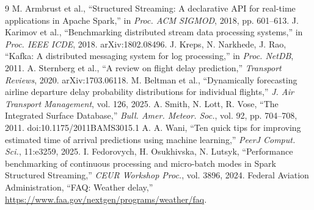 \documentclass[10pt]{article}
\begin{document}
\begingroup\footnotesize
\begin{thebibliography}{9}
\setlength{\itemsep}{0pt}\setlength{\parsep}{0pt}
 M. Armbrust et al., ``Structured Streaming: A declarative API for real-time applications in Apache Spark,'' in \emph{Proc. ACM SIGMOD}, 2018, pp. 601--613.
 J. Karimov et al., ``Benchmarking distributed stream data processing systems,'' in \emph{Proc. IEEE ICDE}, 2018. arXiv:1802.08496.
 J. Kreps, N. Narkhede, J. Rao, ``Kafka: A distributed messaging system for log processing,'' in \emph{Proc. NetDB}, 2011.
 A. Sternberg et al., ``A review on flight delay prediction,'' \emph{Transport Reviews}, 2020. arXiv:1703.06118.
 M. Beltman et al., ``Dynamically forecasting airline departure delay probability distributions for individual flights,'' \emph{J. Air Transport Management}, vol. 126, 2025.
 A. Smith, N. Lott, R. Vose, ``The Integrated Surface Database,'' \emph{Bull. Amer. Meteor. Soc.}, vol. 92, pp. 704--708, 2011. doi:10.1175/2011BAMS3015.1
 A. A. Wani, ``Ten quick tips for improving estimated time of arrival predictions using machine learning,'' \emph{PeerJ Comput. Sci.}, 11:e3259, 2025.
 I. Fedorovych, H. Osukhivska, N. Lutsyk, ``Performance benchmarking of continuous processing and micro-batch modes in Spark Structured Streaming,'' \emph{CEUR Workshop Proc.}, vol. 3896, 2024.
 Federal Aviation Administration, ``FAQ: Weather delay,'' \url{https://www.faa.gov/nextgen/programs/weather/faq}.
\end{thebibliography}
\endgroup
\end{document}
